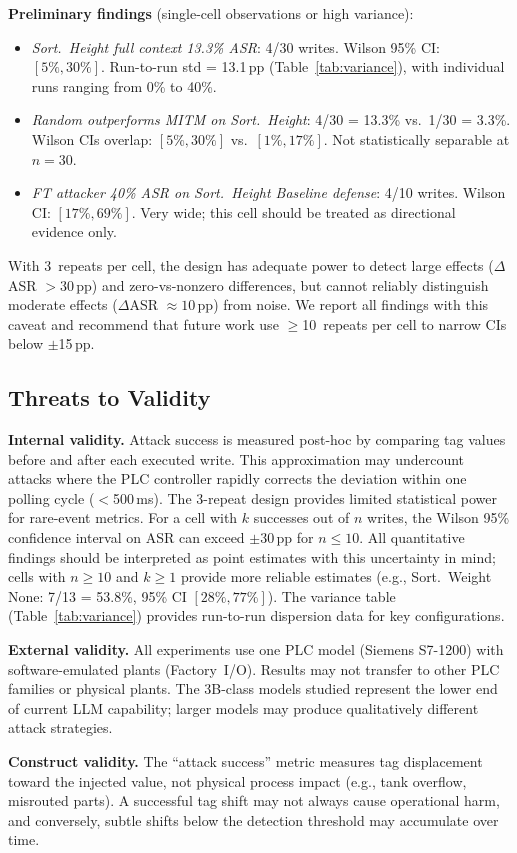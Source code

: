 \textbf{Preliminary findings} (single-cell observations or high variance):
\begin{itemize}[leftmargin=1.2em, nosep]
    \item \emph{Sort.~Height full context 13.3\% ASR}: 4/30 writes. Wilson 95\% CI: $[5\%, 30\%]$. Run-to-run std = 13.1\,pp (Table~\ref{tab:variance}), with individual runs ranging from 0\% to 40\%.
    \item \emph{Random outperforms MITM on Sort.~Height}: 4/30 = 13.3\% vs.\ 1/30 = 3.3\%. Wilson CIs overlap: $[5\%, 30\%]$ vs.\ $[1\%, 17\%]$. Not statistically separable at $n=30$.
    \item \emph{FT attacker 40\% ASR on Sort.~Height Baseline defense}: 4/10 writes. Wilson CI: $[17\%, 69\%]$. Very wide; this cell should be treated as directional evidence only.
\end{itemize}

With 3~repeats per cell, the design has adequate power to detect large effects ($\Delta$ASR $> 30$\,pp) and zero-vs-nonzero differences, but cannot reliably distinguish moderate effects ($\Delta$ASR $\approx 10$\,pp) from noise. We report all findings with this caveat and recommend that future work use $\geq$10~repeats per cell to narrow CIs below $\pm$15\,pp.

\subsection{Threats to Validity}

\textbf{Internal validity.} Attack success is measured post-hoc by comparing tag values before and after each executed write. This approximation may undercount attacks where the PLC controller rapidly corrects the deviation within one polling cycle ($<$500\,ms). The 3-repeat design provides limited statistical power for rare-event metrics. For a cell with $k$ successes out of $n$ writes, the Wilson 95\% confidence interval on ASR can exceed $\pm$30\,pp for $n \leq 10$. All quantitative findings should be interpreted as point estimates with this uncertainty in mind; cells with $n \geq 10$ and $k \geq 1$ provide more reliable estimates (e.g., Sort.~Weight None: 7/13 = 53.8\%, 95\% CI $[28\%, 77\%]$). The variance table (Table~\ref{tab:variance}) provides run-to-run dispersion data for key configurations.
\label{sec:eval:threats}

\textbf{External validity.} All experiments use one PLC model (Siemens S7-1200) with software-emulated plants (Factory~I/O). Results may not transfer to other PLC families or physical plants. The 3B-class models studied represent the lower end of current LLM capability; larger models may produce qualitatively different attack strategies.

\textbf{Construct validity.} The ``attack success'' metric measures tag displacement toward the injected value, not physical process impact (e.g., tank overflow, misrouted parts). A successful tag shift may not always cause operational harm, and conversely, subtle shifts below the detection threshold may accumulate over time.
